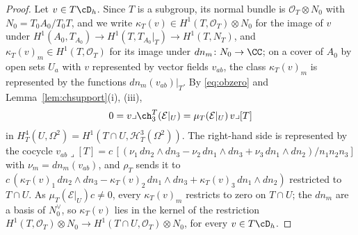 \begin{proof}
Let $v\in T\cD_{h}$. Since $T$ is a subgroup, its normal bundle is $\mathcal{O}_{T}\otimes N_{0}$ with $N_{0}=T_{0}A_{0}/T_{0}T$, and we write $\kappa_{T}(v)\in H^{1}(T,\mathcal{O}_{T})\otimes N_{0}$ for the image of $v$ under $H^{1}(A_{0},T_{A_{0}})\to H^{1}(T,T_{A_{0}}|_{T})\to H^{1}(T,N_{T})$, and $\kappa_{T}(v)_{m}\in H^{1}(T,\mathcal{O}_{T})$ for its image under $dn_{m}\colon N_{0}\to\CC$; on a cover of $A_{0}$ by open sets $U_{a}$ with $v$ represented by vector fields $v_{ab}$, the class $\kappa_{T}(v)_{m}$ is represented by the functions $dn_{m}(v_{ab})|_{T}$. By \eqref{eq:obzero} and Lemma~\ref{lem:chsupport}(i), (iii),
\[
0=v\lrcorner\ch^{T}_{3}(\mathcal{E}|_{U})=\mu_{T}(\mathcal{E}|_{U})\,v\lrcorner[T]
\]
in $H^{4}_{T}(U,\Omega^{2})=H^{1}(T\cap U,\mathcal{H}^{3}_{T}(\Omega^{2}))$.
The right-hand side is represented by the cocycle $v_{ab}\lrcorner[T]=c\,[(\nu_{1}\,dn_{2}\wedge dn_{3}-\nu_{2}\,dn_{1}\wedge dn_{3}+\nu_{3}\,dn_{1}\wedge dn_{2})/n_{1}n_{2}n_{3}]$ with $\nu_{m}=dn_{m}(v_{ab})$, and $\rho_{T}$ sends it to $c\,(\kappa_{T}(v)_{1}\,dn_{2}\wedge dn_{3}-\kappa_{T}(v)_{2}\,dn_{1}\wedge dn_{3}+\kappa_{T}(v)_{3}\,dn_{1}\wedge dn_{2})$ restricted to $T\cap U$. As $\mu_{T}(\mathcal{E}|_{U})c\ne0$, every $\kappa_{T}(v)_{m}$ restricts to zero on $T\cap U$; the $dn_{m}$ are a basis of $N_{0}^{\vee}$, so $\kappa_{T}(v)$ lies in the kernel of the restriction $H^{1}(T,\mathcal{O}_{T})\otimes N_{0}\to H^{1}(T\cap U,\mathcal{O}_{T})\otimes N_{0}$, for every $v\in T\cD_{h}$.


\end{proof}
